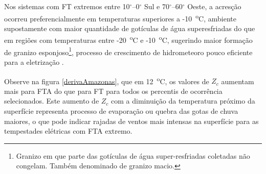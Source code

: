 Nos sistemas com FT extremos entre 10$^{\circ}$--0$^{\circ}$ Sul e 70$^{\circ}$--60$^{\circ}$ Oeste, a acresção ocorreu preferencialmente em temperaturas superiores a -10~\textsuperscript{o}C, ambiente supostamente com maior quantidade de gotículas de água superesfriadas do que em regiões com temperaturas entre -20~\textsuperscript{o}C e -10~\textsuperscript{o}C, sugerindo maior formação de granizo esponjoso\footnote{Granizo em que parte das gotículas de água super-resfriadas coletadas não congelam. Também denominado de granizo macio.}, processo de crescimento de hidrometeoro pouco eficiente para a eletrização \cite{jayaratne1983}. 



Observe na figura \ref{derivaAmazonas}, que em 12~\textsuperscript{o}C, os valores de $Z_c$ aumentam mais para FTA do que para FT para todos os percentis de ocorrência selecionados. Este aumento de $Z_c$ com a diminuição da temperatura próximo da superfície representa processo de evaporação ou quebra das gotas de chuva maiores, o que pode indicar rajadas de ventos mais intensas na superfície para as tempestades elétricas com FTA extremo. 



